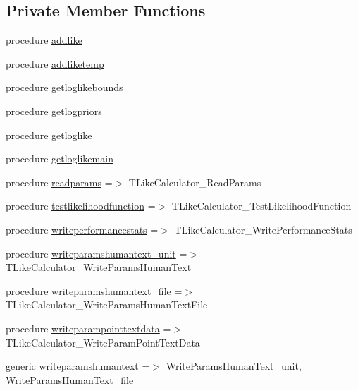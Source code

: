 \subsection*{Private Member Functions}
\begin{DoxyCompactItemize}
\item 
procedure \mbox{\hyperlink{structcalclike_1_1tlikecalculator_a29ce83d0be67daba46b667a4960ac20b}{addlike}}
\item 
procedure \mbox{\hyperlink{structcalclike_1_1tlikecalculator_a6fc9a804088c7682e9752ac6fd42c8b9}{addliketemp}}
\item 
procedure \mbox{\hyperlink{structcalclike_1_1tlikecalculator_a06a8640728762fd080c70aaef29998fc}{getloglikebounds}}
\item 
procedure \mbox{\hyperlink{structcalclike_1_1tlikecalculator_a1c68982de09916657e7c2799ed9041b5}{getlogpriors}}
\item 
procedure \mbox{\hyperlink{structcalclike_1_1tlikecalculator_a3bb5bdf9540fd23caa65b0a2f5ad23b0}{getloglike}}
\item 
procedure \mbox{\hyperlink{structcalclike_1_1tlikecalculator_a5309b377f28118969e42f7a31a31f698}{getloglikemain}}
\item 
procedure \mbox{\hyperlink{structcalclike_1_1tlikecalculator_aef7fceb62260a719e8abb99eee739959}{readparams}} =$>$ T\+Like\+Calculator\+\_\+\+Read\+Params
\item 
procedure \mbox{\hyperlink{structcalclike_1_1tlikecalculator_adbe2a56a68f3b827e294db0ec5fb60e6}{testlikelihoodfunction}} =$>$ T\+Like\+Calculator\+\_\+\+Test\+Likelihood\+Function
\item 
procedure \mbox{\hyperlink{structcalclike_1_1tlikecalculator_abbb82fa60505c2df51325bb0f9a05782}{writeperformancestats}} =$>$ T\+Like\+Calculator\+\_\+\+Write\+Performance\+Stats
\item 
procedure \mbox{\hyperlink{structcalclike_1_1tlikecalculator_a740651e048886393e22f7b5fab51803d}{writeparamshumantext\+\_\+unit}} =$>$ T\+Like\+Calculator\+\_\+\+Write\+Params\+Human\+Text
\item 
procedure \mbox{\hyperlink{structcalclike_1_1tlikecalculator_ac712abb757b7657bb0d5fce122e0da5e}{writeparamshumantext\+\_\+file}} =$>$ T\+Like\+Calculator\+\_\+\+Write\+Params\+Human\+Text\+File
\item 
procedure \mbox{\hyperlink{structcalclike_1_1tlikecalculator_a21b3f63a6a6d78f36b67438c73c35cdb}{writeparampointtextdata}} =$>$ T\+Like\+Calculator\+\_\+\+Write\+Param\+Point\+Text\+Data
\item 
generic \mbox{\hyperlink{structcalclike_1_1tlikecalculator_af5bc42c7b077ea719921fdcab9cf096c}{writeparamshumantext}} =$>$ Write\+Params\+Human\+Text\+\_\+unit, Write\+Params\+Human\+Text\+\_\+file
\end{DoxyCompactItemize}
